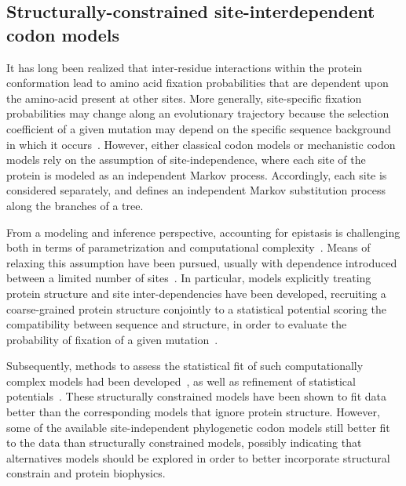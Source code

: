 \subsection{Structurally-constrained site-interdependent codon models}
\label{subsec:structurally-constrained-site-interdependent-codon-models}

It has long been realized that inter-residue interactions within the protein conformation lead to amino acid fixation probabilities that are dependent upon the amino-acid present at other sites.
More generally, site-specific fixation probabilities may change along an evolutionary trajectory because the selection coefficient of a given mutation may depend on the specific sequence background in which it occurs~\citep{Goldstein2016}.
However, either classical codon models or mechanistic codon models rely on the assumption of site-independence, where each site of the protein is modeled as an independent Markov process.
Accordingly, each site is considered separately, and defines an independent Markov substitution process along the branches of a tree.

From a modeling and inference perspective, accounting for epistasis is challenging both in terms of parametrization and computational complexity~\citep{Manhart2014}.
Means of relaxing this assumption have been pursued, usually with dependence introduced between a limited number of sites~\citep{Felsenstein1996}.
In particular, models explicitly treating protein structure and site inter-dependencies have been developed, recruiting a coarse-grained protein structure conjointly to a statistical potential scoring the compatibility between sequence and structure, in order to evaluate the probability of fixation of a given mutation~\citep{Robinson2003, Rodrigue2005}.

Subsequently, methods to assess the statistical fit of such computationally complex models had been developed~\citep{Rodrigue2009}, as well as refinement of statistical potentials~\citep{Kleinman2010}.
These structurally constrained models have been shown to fit data better than the corresponding models that ignore protein structure.
However, some of the available site-independent phylogenetic codon models still better fit to the data than structurally constrained models, possibly indicating that alternatives models should be explored in order to better incorporate structural constrain and protein biophysics.

